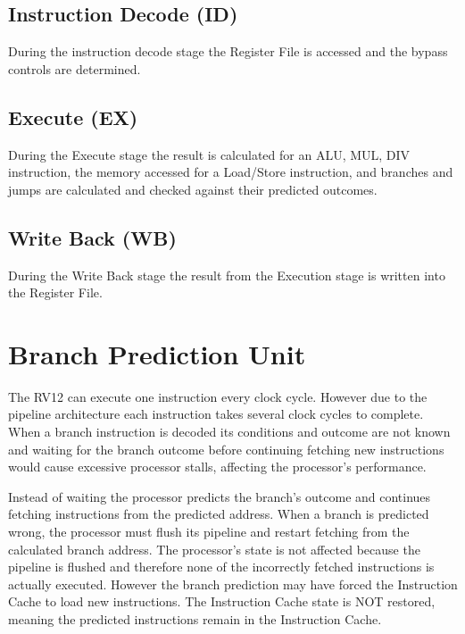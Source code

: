 \subsection{Instruction Decode (ID)} \label{instruction-decode-id}

During the instruction decode stage the Register File is accessed and the bypass
controls are determined.

\subsection{Execute (EX)} \label{execute-ex}

During the Execute stage the result is calculated for an ALU, MUL, DIV
instruction, the memory accessed for a Load/Store instruction, and branches and
jumps are calculated and checked against their predicted outcomes.

\subsection{Write Back (WB)} \label{write-back-wb}

During the Write Back stage the result from the Execution stage is written into
the Register File.

\section{Branch Prediction Unit} \label{branch-prediction-unit}

The RV12 can execute one instruction every clock cycle.  However due to the
pipeline architecture each instruction takes several clock cycles to complete.
When a branch instruction is decoded its conditions and outcome are not known
and waiting for the branch outcome before continuing fetching new instructions
would cause excessive processor stalls, affecting the processor's performance.

Instead of waiting the processor predicts the branch's outcome and continues
fetching instructions from the predicted address. When a branch is predicted
wrong, the processor must flush its pipeline and restart fetching from the
calculated branch address.  The processor's state is not affected because the
pipeline is flushed and therefore none of the incorrectly fetched instructions
is actually executed.  However the branch prediction may have forced the
Instruction Cache to load new instructions.  The Instruction Cache state is NOT
restored, meaning the predicted instructions remain in the Instruction Cache.

